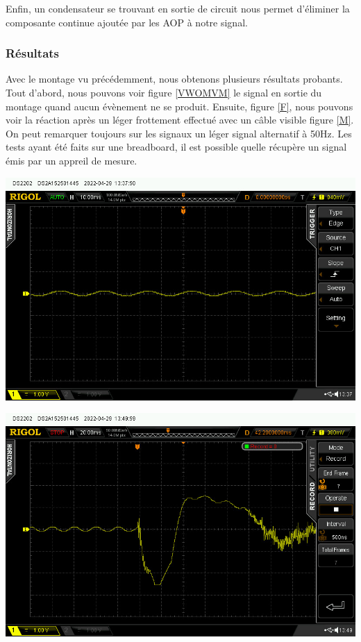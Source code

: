 \documentclass[12pt,french,a4paper]{article}
\begin{document}
Enfin, un condensateur se trouvant en sortie de circuit nous permet d’éliminer la composante continue ajoutée par les AOP à notre signal.


\subsubsection{Résultats}
Avec le montage vu précédemment, nous obtenons plusieurs résultats probants.
Tout d'abord, nous pouvons voir figure \ref{VWOMVM} le signal en sortie du montage quand aucun évènement ne se produit.
Ensuite, figure \ref{F}, nous pouvons voir la réaction après un léger frottement effectué avec un câble visible figure \ref{M}. 
On peut remarquer toujours sur les signaux un léger signal alternatif à 50Hz. Les tests ayant été faits sur une breadboard, il est possible quelle récupère un signal émis par un appreil de mesure.

\begin{center}	
\includegraphics[scale=0.5]{../img/plat.jpg}
\label{VWOMVM}
\end{center}

\begin{center}	
\includegraphics[scale=0.5]{../img/frotment.jpg}
\label{F}
\end{center}
\end{document}
